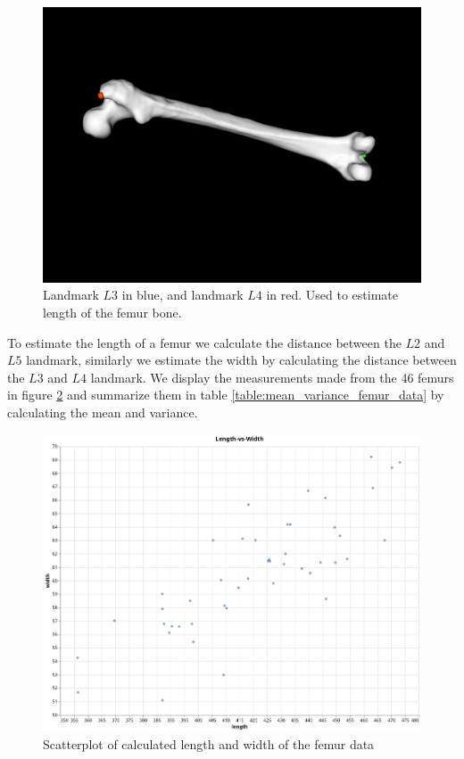 \documentclass[10pt]{article}
\begin{document}
\begin{figure}[h]
\centering
\includegraphics[scale=0.2]{screenshots/L2red_L5green_length.png}
\caption{Landmark $L3$ in blue, and landmark $L4$ in red. Used to estimate length of the femur bone.}
\label{fig:landmark_length}
\end{figure}
\noindent
To estimate the length of a femur we calculate the distance between the $L2$ and $L5$ landmark, similarly we estimate the width by calculating the distance between the $L3$ and $L4$ landmark. We display the measurements made from the 46 femurs in figure \ref{fig:scatterplot_femurdata} and summarize them in table \ref{table:mean_variance_femur_data} by calculating the mean and variance.
\begin{figure}
\centering
\includegraphics[scale=0.4]{screenshots/femur_data_length_width_scatter.png}
\caption{Scatterplot of calculated length and width of the femur data}
\label{fig:scatterplot_femurdata}
\end{figure}
\end{document}
